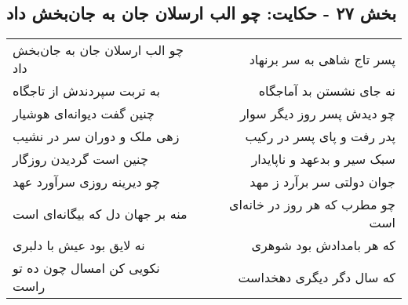 \begin{center}
\section*{بخش ۲۷ - حکایت: چو الب ارسلان جان به جان‌بخش داد}
\label{sec:027}
\begin{longtable}{l p{0.5cm} r}
چو الب ارسلان جان به جان‌بخش داد
&&
پسر تاج شاهی به سر برنهاد
\\
به تربت سپردندش از تاجگاه
&&
نه جای نشستن بد آماجگاه
\\
چنین گفت دیوانه‌ای هوشیار
&&
چو دیدش پسر روز دیگر سوار
\\
زهی ملک و دوران سر در نشیب
&&
پدر رفت و پای پسر در رکیب
\\
چنین است گردیدن روزگار
&&
سبک سیر و بدعهد و ناپایدار
\\
چو دیرینه روزی سرآورد عهد
&&
جوان دولتی سر برآرد ز مهد
\\
منه بر جهان دل که بیگانه‌ای است
&&
چو مطرب که هر روز در خانه‌ای است
\\
نه لایق بود عیش با دلبری
&&
که هر بامدادش بود شوهری
\\
نکویی کن امسال چون ده تو راست
&&
که سال دگر دیگری دهخداست
\\
\end{longtable}
\end{center}
